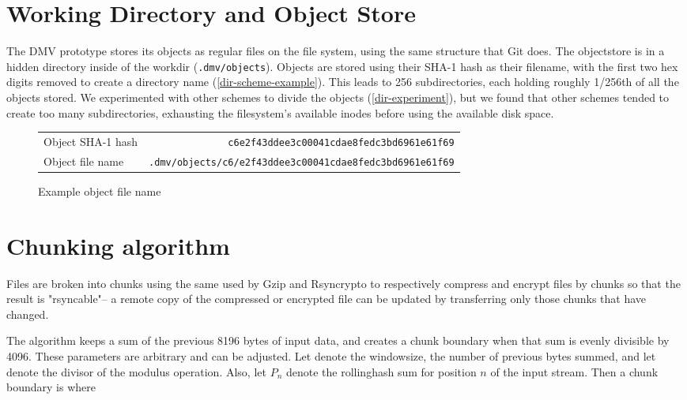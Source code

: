 \section{Working Directory and Object Store}\label{dir-impl}

The \gls{DMV} prototype stores its objects as regular files on the file system,
using the same structure that Git does. The \gls{objectstore} is in a hidden
directory inside of the \gls{workdir} (\lstinline{.dmv/objects}). Objects are
stored using their SHA-1 hash as their filename, with the first two hex digits
removed to create a directory name (\autoref{dir-scheme-example}). This leads to
\num{256} subdirectories, each holding roughly \num{1/256}th of all the objects
stored. We experimented with other schemes to divide the objects
(\autoref{dir-experiment}), but we found that other schemes tended to create too
many subdirectories, exhausting the filesystem's available inodes before using
the available disk space.

\begin{figure}[h]
    \caption{Example object file name}
    \label{dir-scheme-example}
    \begin{tabular}{ l r }
        Object SHA-1 hash & \lstinline{c6e2f43ddee3c00041cdae8fedc3bd6961e61f69} \\
        Object file name & \lstinline{.dmv/objects/c6/e2f43ddee3c00041cdae8fedc3bd6961e61f69} \\
    \end{tabular}
\end{figure}

%


\section{Chunking algorithm}\label{chunking-algoritm}

Files are broken into chunks using the same  used by Gzip
and Rsyncrypto\cite{rsyncrypto_algorithm} to respectively compress and encrypt
files by chunks so that the result is "rsyncable"-- a remote copy of the
compressed or encrypted file can be updated by transferring only those chunks
that have changed.

The algorithm keeps a sum of the previous \num{8196} bytes of input data, and
creates a chunk boundary when that sum is evenly divisible by \num{4096}. These
parameters are arbitrary and can be adjusted. Let  denote
the \gls{windowsize}, the number of previous bytes summed, and let
 denote the \gls{divisor} of the modulus operation. Also, let
$P_n$ denote the \gls{rollinghash} sum for position $n$ of the input stream.
Then a chunk boundary is where

